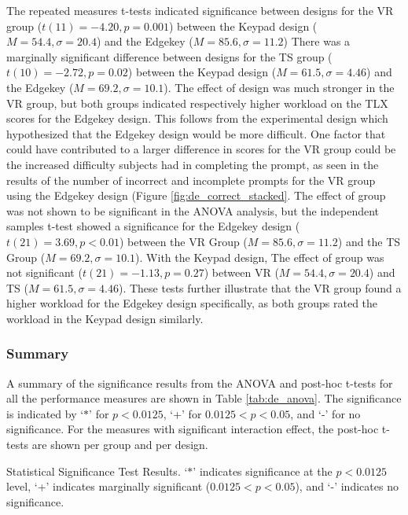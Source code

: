 The repeated measures t-tests indicated significance between designs for the VR group ($t(11) = -4.20, p = 0.001$) between the Keypad design ($M = 54.4, \sigma = 20.4$) and the Edgekey ($M = 85.6, \sigma = 11.2$)
There was a marginally significant difference between designs for the TS group ($t(10) = -2.72, p = 0.02$) between the Keypad design ($M = 61.5, \sigma = 4.46$) and the Edgekey ($M = 69.2, \sigma = 10.1$).
The effect of design was much stronger in the VR group, but both groups indicated respectively higher workload on the TLX scores for the Edgekey design.
This follows from the experimental design which hypothesized that the Edgekey design would be more difficult.
One factor that could have contributed to a larger difference in scores for the VR group could be the increased difficulty subjects had in completing the prompt, as seen in the results of the number of incorrect and incomplete prompts for the VR group using the Edgekey design (Figure \ref{fig:de_correct_stacked}.
The effect of group was not shown to be significant in the ANOVA analysis, but the independent samples t-test showed a significance for the Edgekey design ($t(21) = 3.69, p < 0.01$) between the VR Group ($M = 85.6, \sigma = 11.2$) and the TS Group ($M = 69.2, \sigma = 10.1$).
With the Keypad design, The effect of group was not significant ($t(21) = -1.13, p=0.27$) between VR ($M = 54.4, \sigma = 20.4$) and TS ($M = 61.5, \sigma = 4.46$).
These tests further illustrate that the VR group found a higher workload for the Edgekey design specifically, as both groups rated the workload in the Keypad design similarly.


\subsubsection{Summary}

A summary of the significance results from the ANOVA and post-hoc t-tests for all the performance measures are shown in Table \ref{tab:de_anova}.
The significance is indicated by `$*$' for $p<0.0125$, `+' for $0.0125<p<0.05$, and `-' for no significance.
For the measures with significant interaction effect, the post-hoc t-tests are shown per group and per design.

\begin{table}
    \centering
    \caption{Statistical Significance Test Results. `$*$' indicates significance at the $p<0.0125$ level, `+' indicates marginally significant ($0.0125<p<0.05$), and `-' indicates no significance.}
    \label{tab:de_anova}
\end{table}

